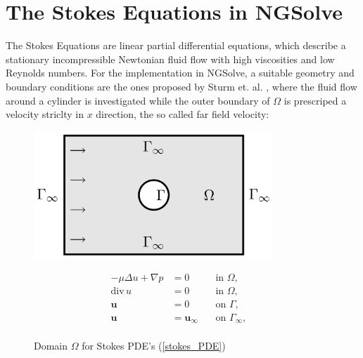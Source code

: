 \section{The Stokes Equations in NGSolve}

The Stokes Equations are linear partial differential equations, which describe a stationary incompressible Newtonian fluid flow
with high viscosities and low Reynolds numbers. For the implementation in NGSolve, a suitable geometry and boundary conditions are 
the ones proposed by Sturm et. al. \cite{nearly_conformal_paper}, where the fluid flow around a cylinder is investigated while the
outer boundary of $\Omega$ is prescriped a velocity striclty in $x$ direction, the so called far field velocity:

\null

\begin{figure}[!htbp]
\begin{minipage}{.5\textwidth}
    \centering
    \includegraphics[width=0.8\textwidth]{figures/domain_graphic_sturm.PNG}
    \caption{Domain $\Omega$ for Stokes PDE's (\ref{stokes_PDE}) \cite{nearly_conformal_paper}}
    \label{domain_graphics}
\end{minipage}
\begin{minipage}{.5\textwidth}
    \begin{equation}\label{stokes_PDE}
        \begin{aligned}
            -\mu \Delta u + \nabla p &=0& \, &\text{in } \Omega,& \\
            \mathrm{div} \, u &=0& \, &\text{in } \Omega,& \\
            \mathbf{u} &=0& \, &\text{on } \Gamma,& \\
            \mathbf{u} &=\mathbf{u}_{\infty}& \, &\text{on } \Gamma_{\infty},& \\
        \end{aligned}
    \end{equation}
\end{minipage}
\end{figure}

